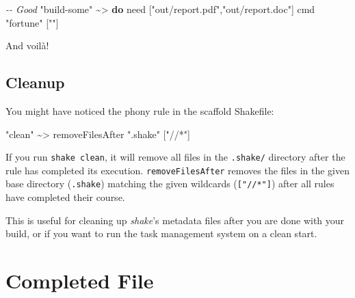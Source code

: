 \documentclass[]{article}
\newenvironment{Shaded}{}{}
\newcommand{\CommentTok}[1]{\textcolor[rgb]{0.38,0.63,0.69}{\textit{#1}}}
\newcommand{\KeywordTok}[1]{\textcolor[rgb]{0.00,0.44,0.13}{\textbf{#1}}}
\newcommand{\NormalTok}[1]{#1}
\newcommand{\OperatorTok}[1]{\textcolor[rgb]{0.40,0.40,0.40}{#1}}
\newcommand{\StringTok}[1]{\textcolor[rgb]{0.25,0.44,0.63}{#1}}
\begin{document}
\begin{Shaded}
\begin{Highlighting}[]
\CommentTok{{-}{-} Good}
\StringTok{"build{-}some"} \OperatorTok{\textasciitilde{}\textgreater{}} \KeywordTok{do}
\NormalTok{    need [}\StringTok{"out/report.pdf"}\NormalTok{,}\StringTok{"out/report.doc"}\NormalTok{]}
\NormalTok{    cmd }\StringTok{"fortune"}\NormalTok{ [}\StringTok{""}\NormalTok{]}
\end{Highlighting}
\end{Shaded}

And voilà!

\subsection{Cleanup}\label{cleanup}

You might have noticed the phony rule in the scaffold Shakefile:

\begin{Shaded}
\begin{Highlighting}[]
\StringTok{"clean"} \OperatorTok{\textasciitilde{}\textgreater{}}\NormalTok{ removeFilesAfter }\StringTok{".shake"}\NormalTok{ [}\StringTok{"//*"}\NormalTok{]}
\end{Highlighting}
\end{Shaded}

If you run \texttt{shake\ clean}, it will remove all files in the
\texttt{.shake/} directory after the rule has completed its execution.
\texttt{removeFilesAfter} removes the files in the given base directory
(\texttt{.shake}) matching the given wildcards (\texttt{{[}"//*"{]}}) after all
rules have completed their course.

This is useful for cleaning up \emph{shake}'s metadata files after you are done
with your build, or if you want to run the task management system on a clean
start.

\section{Completed File}\label{completed-file}
\end{document}
